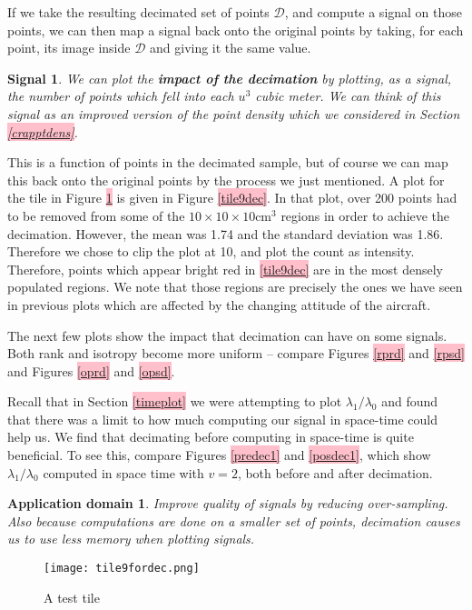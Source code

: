 \documentclass[a4paper,11pt,twoside]{article}
\newtheorem*{signals}{Signal}
\newtheorem*{appdom}{Application domain}
\theoremstyle{definition}
\theoremstyle{remark}
\newcommand{\sh}[1]{\colorbox{pink}{#1}}
\newcommand{\lnk}[1]{\sh{\hyperref[#1]{\ref*{#1}}}}
\newenvironment{sigs}
   {\colorlet{shadecolor}{green!50}\begin{shaded}\begin{signals}}
   {\end{signals}\end{shaded}}
\newenvironment{app}
   {\colorlet{shadecolor}{red!50}\begin{shaded}\begin{appdom}}
   {\end{appdom}\end{shaded}}
\begin{document}
If we take the resulting decimated set of points $\mathcal{D}$, and compute a signal on those points, we can then map a signal back onto the original points by taking, for each point, its image inside $\mathcal{D}$ and giving it the same value.
\begin{sigs}
We can plot the \textbf{impact of the decimation} by plotting, as a signal, the number of points which fell into each $u^3$ cubic meter. We can think of this signal as an improved version of the point density which we considered in Section \lnk{crapptdens}.
\end{sigs}
This is a function of points in the decimated sample, but of course we can map this back onto the original points by the process we just mentioned. A plot for the tile in Figure \lnk{tile9fordec} is given in Figure \lnk{tile9dec}. In that plot, over 200 points had to be removed from some of the $10\times 10\times 10\mathrm{cm}^3$ regions in order to achieve the decimation. However, the mean was 1.74 and the standard deviation was 1.86. Therefore we chose to clip the plot at 10, and plot the count as intensity. Therefore, points which appear bright red in \lnk{tile9dec} are in the most densely populated regions. We note that those regions are precisely the ones we have seen in previous plots which are affected by the changing attitude of the aircraft.

The next few plots show the impact that decimation can have on some signals. Both rank and isotropy become more uniform -- compare Figures \lnk{rprd} and \lnk{rpsd} and Figures \lnk{oprd} and \lnk{opsd}.

Recall that in Section \lnk{timeplot} we were attempting to plot $\lambda_1/\lambda_0$ and found that there was a limit to how much computing our signal in space-time could help us. We find that decimating before computing in space-time is quite beneficial. To see this, compare Figures \lnk{predec1} and \lnk{posdec1}, which show $\lambda_1/\lambda_0$ computed in space time with $v=2$, both before and after decimation.
\begin{app}Improve quality of signals by reducing over-sampling. Also because computations are done on a smaller set of points, decimation causes us to use less memory when plotting signals.
\end{app}
\newpage
\begin{figure}[!h]
  \caption{A test tile}
  \centering
    \texttt{[image: tile9fordec.png]}
    \label{tile9fordec}
\end{figure}
\end{document}
